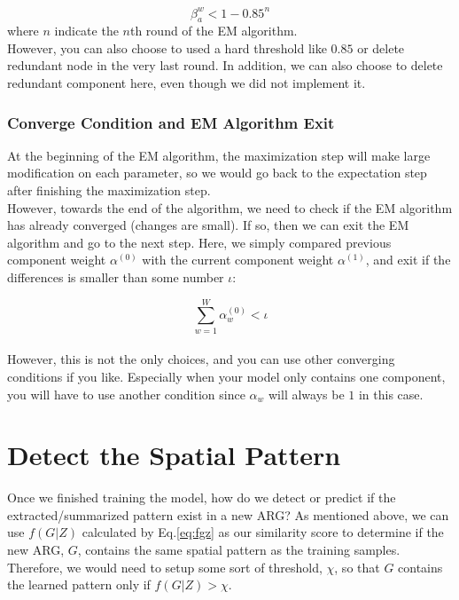 \begin{equation} 
\beta^w_a < 1 - 0.85^n
\end{equation}
where $n$ indicate the $n$th round of the EM algorithm.\\

However, you can also choose to used a hard threshold like $0.85$ or delete redundant node in the very last round. In addition, we can also choose to delete redundant component here, even though we did not implement it.

\subsubsection{Converge Condition and EM Algorithm Exit}

At the beginning of the EM algorithm, the maximization step will make large modification on each parameter, so we would go back to the expectation step after finishing the maximization step. \\

However, towards the end of the algorithm, we need to check if the EM algorithm has already converged (changes are small). If so, then we can exit the EM algorithm and go to the next step. Here, we simply compared previous component weight $\alpha^{(0)}$ with the current component weight $\alpha^{(1)}$, and exit if the differences is smaller than some number $\iota$:

\begin{equation} 
\sum^{W}_{w=1}\alpha^{(0)}_w<\iota
\end{equation}\\

However, this is not the only choices, and you can use other converging conditions if you like. Especially when your model only contains one component, you will have to use another condition since $\alpha_w$ will always be $1$ in this case.\\

\newpage

\section{Detect the Spatial Pattern}

Once we finished training the model, how do we detect or predict if the extracted/summarized pattern exist in a new ARG? As mentioned above, we can use $f(G|Z)$ calculated by Eq.\ref{eq:fgz} as our similarity score to determine if the new ARG, $G$, contains the same spatial pattern as the training samples. Therefore, we would need to setup some sort of threshold, $\chi$, so that $G$ contains the learned pattern only if $f(G|Z)>\chi$.\\ 

